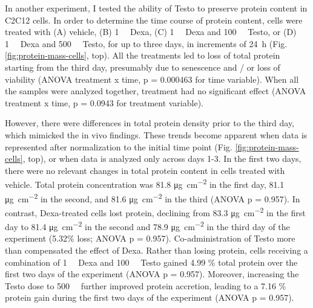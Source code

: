 \documentclass[12pt,english]{report}\usepackage[]{graphicx}\usepackage[]{color}
\begin{document}
In another experiment, I tested the ability of Testo to preserve protein
content in C2C12 cells. In order to determine the time course of protein
content, cells were treated with (A) vehicle, (B) \SI{1}{\micro\molar}
Dexa, (C) \SI{1}{\micro\molar} Dexa and \SI{100}{\nano\molar} Testo,
or (D) \SI{1}{\micro\molar} Dexa and \SI{500}{\nano\molar} Testo,
for up to three days, in increments of \SI{24}{\hour} (Fig. \ref{fig:protein-mass-cells},
top). All the treatments led to loss of total protein starting from
the third day, presumably due to senescence and / or loss of viability
(ANOVA treatment x time, p = 0.000463
for time variable). When all the samples were analyzed together, treatment
had no significant effect (ANOVA treatment x time, p = 0.0943
for treatment variable).

However, there were differences in total protein density prior to
the third day, which mimicked the in vivo findings. These trends become
apparent when data is represented after normalization to the initial
time point (Fig. \ref{fig:protein-mass-cells}, top), or when data
is analyzed only across days 1-3. In the first two days, there were
no relevant changes in total protein content in cells treated with
vehicle. Total protein concentration was 81.8
\si{\micro\gram\per\centi\meter\squared} in the first day, 81.1
\si{\micro\gram\per\centi\meter\squared} in the second, and 81.6
\si{\micro\gram\per\centi\meter\squared} in the third (ANOVA p =
0.957).
In contrast, Dexa-treated cells lost protein, declining from 83.3
\si{\micro\gram\per\centi\meter\squared} in the first day to 81.4
\si{\micro\gram\per\centi\meter\squared} in the second and 78.9
\si{\micro\gram\per\centi\meter\squared} in the third day of the
experiment (5.32\%
loss; ANOVA p = 0.957).
Co-administration of Testo more than compensated the effect of Dexa.
Rather than losing protein, cells receiving a combination of \SI{1}{\micro\molar}
Dexa and \SI{100}{\nano\molar} Testo gained 4.99
\% total protein over the first two days of the experiment (ANOVA
p = 0.957).
Moreover, increasing the Testo dose to \SI{500}{\nano\molar} further
improved protein accretion, leading to a 7.16
\% protein gain during the first two days of the experiment (ANOVA
p = 0.957).
\end{document}

